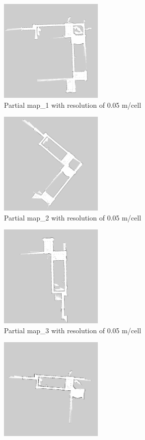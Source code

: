 \begin{figure}[H]
\begin{subfigure}{0.5\textwidth}
\includegraphics[width=0.9\linewidth, height=5cm]{figs/real_world_results/a/partial_map_1.jpg} 
\caption{Partial map\_1 with resolution of 0.05 m/cell}
\label{fig:real31}
\end{subfigure}
\begin{subfigure}{0.5\textwidth}
\includegraphics[width=0.9\linewidth, height=5cm]{figs/real_world_results/a/partial_map_2.jpg} 
\caption{Partial map\_2 with resolution of 0.05 m/cell}
\label{fig:real32}
\end{subfigure}
\begin{subfigure}{0.5\textwidth}
\includegraphics[width=0.9\linewidth, height=5cm]{figs/real_world_results/a/partial_map_3.jpg} 
\caption{Partial map\_3 with resolution of 0.05 m/cell}
\label{fig:real33}
\end{subfigure}
\begin{subfigure}{0.5\textwidth}
\includegraphics[width=0.9\linewidth, height=5cm]{figs/real_world_results/a/partial_map_4.jpg} 

\end{subfigure}
\end{figure}
